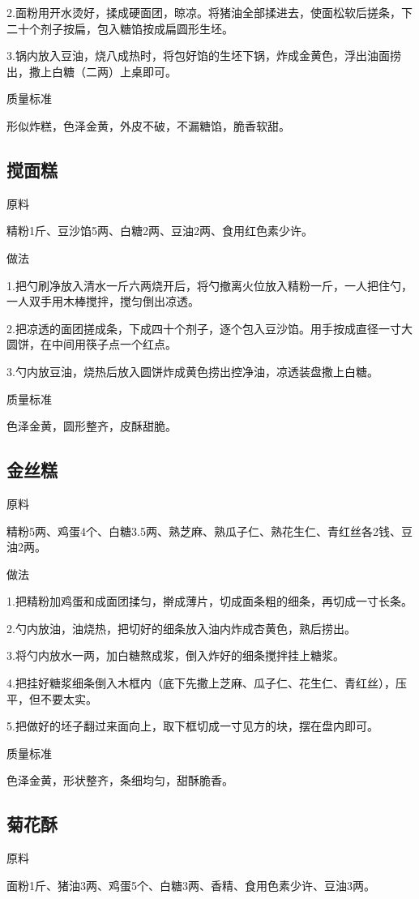 \documentclass{ctexbook}
\begin{document}
2.面粉用开水烫好，揉成硬面团，晾凉。将猪油全部揉进去，使面松软后搓条，下二十个剂子按扁，包入糖馅按成扁圆形生坯。

3.锅内放入豆油，烧八成热时，将包好馅的生坯下锅，炸成金黄色，浮出油面捞出，撒上白糖（二两）上桌即可。

质量标准

形似炸糕，色泽金黄，外皮不破，不漏糖馅，脆香软甜。
\subsection{搅面糕}
原料

精粉1斤、豆沙馅5两、白糖2两、豆油2两、食用红色素少许。

做法

1.把勺刷净放入清水一斤六两烧开后，将勺撤离火位放入精粉一斤，一人把住勺，一人双手用木棒搅拌，搅匀倒出凉透。

2.把凉透的面团搓成条，下成四十个剂子，逐个包入豆沙馅。用手按成直径一寸大圆饼，在中间用筷子点一个红点。

3.勺内放豆油，烧热后放入圆饼炸成黄色捞出控净油，凉透装盘撒上白糖。

质量标准

色泽金黄，圆形整齐，皮酥甜脆。
\subsection{金丝糕}
原料

精粉5两、鸡蛋4个、白糖3.5两、熟芝麻、熟瓜子仁、熟花生仁、青红丝各2钱、豆油2两。

做法

1.把精粉加鸡蛋和成面团揉匀，擀成薄片，切成面条粗的细条，再切成一寸长条。

2.勺内放油，油烧热，把切好的细条放入油内炸成杏黄色，熟后捞出。

3.将勺内放水一两，加白糖熬成浆，倒入炸好的细条搅拌挂上糖浆。

4.把挂好糖浆细条倒入木框内（底下先撒上芝麻、瓜子仁、花生仁、青红丝），压平，但不要太实。

5.把做好的坯子翻过来面向上，取下框切成一寸见方的块，摆在盘内即可。

质量标准

色泽金黄，形状整齐，条细均匀，甜酥脆香。
\subsection{菊花酥}
原料

面粉1斤、猪油3两、鸡蛋5个、白糖3两、香精、食用色素少许、豆油3两。
\end{document}
